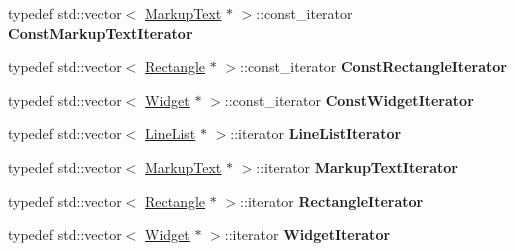 \begin{DoxyCompactItemize}
\item 
\hypertarget{classMezzanine_1_1UI_1_1Layer_a67513721163492efbda30690e3fea07c}{
typedef std::vector$<$ \hyperlink{classMezzanine_1_1UI_1_1MarkupText}{MarkupText} $\ast$ $>$::const\_\-iterator {\bfseries ConstMarkupTextIterator}}
\label{classMezzanine_1_1UI_1_1Layer_a67513721163492efbda30690e3fea07c}

\item 
\hypertarget{classMezzanine_1_1UI_1_1Layer_aa7ff0048492cab919a586eb224925a7a}{
typedef std::vector$<$ \hyperlink{classMezzanine_1_1UI_1_1Rectangle}{Rectangle} $\ast$ $>$::const\_\-iterator {\bfseries ConstRectangleIterator}}
\label{classMezzanine_1_1UI_1_1Layer_aa7ff0048492cab919a586eb224925a7a}

\item 
\hypertarget{classMezzanine_1_1UI_1_1Layer_a2038971c5f051cc5fd3e8fbd9e811b3d}{
typedef std::vector$<$ \hyperlink{classMezzanine_1_1UI_1_1Widget}{Widget} $\ast$ $>$::const\_\-iterator {\bfseries ConstWidgetIterator}}
\label{classMezzanine_1_1UI_1_1Layer_a2038971c5f051cc5fd3e8fbd9e811b3d}

\item 
\hypertarget{classMezzanine_1_1UI_1_1Layer_a72ccb7f1c0ac86a554184e45b211eb95}{
typedef std::vector$<$ \hyperlink{classMezzanine_1_1UI_1_1LineList}{LineList} $\ast$ $>$::iterator {\bfseries LineListIterator}}
\label{classMezzanine_1_1UI_1_1Layer_a72ccb7f1c0ac86a554184e45b211eb95}

\item 
\hypertarget{classMezzanine_1_1UI_1_1Layer_a0f50ec2d145cb8887f8c55655c1adb40}{
typedef std::vector$<$ \hyperlink{classMezzanine_1_1UI_1_1MarkupText}{MarkupText} $\ast$ $>$::iterator {\bfseries MarkupTextIterator}}
\label{classMezzanine_1_1UI_1_1Layer_a0f50ec2d145cb8887f8c55655c1adb40}

\item 
\hypertarget{classMezzanine_1_1UI_1_1Layer_ab4a8916f6243728e0dd8b0293fd39ce4}{
typedef std::vector$<$ \hyperlink{classMezzanine_1_1UI_1_1Rectangle}{Rectangle} $\ast$ $>$::iterator {\bfseries RectangleIterator}}
\label{classMezzanine_1_1UI_1_1Layer_ab4a8916f6243728e0dd8b0293fd39ce4}

\item 
\hypertarget{classMezzanine_1_1UI_1_1Layer_a855cde429bdb0e4fbc38d3bda40383c1}{
typedef std::vector$<$ \hyperlink{classMezzanine_1_1UI_1_1Widget}{Widget} $\ast$ $>$::iterator {\bfseries WidgetIterator}}
\label{classMezzanine_1_1UI_1_1Layer_a855cde429bdb0e4fbc38d3bda40383c1}

\end{DoxyCompactItemize}
